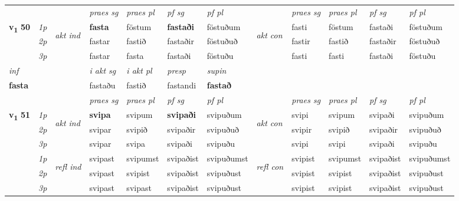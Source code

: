 \begin{longtable}[l]{X>{\footnotesize\itshape}llXXXXlXXXX}
 & &   & \textit{praes sg}  & \textit{praes pl}    & \textit{ pf sg} & \textit{pf pl} & & \textit{praes sg}  & \textit{praes pl}    & \textit{pf sg} & \textit{pf pl }  \\ \cmidrule{4-7} \cmidrule{9-12}
 \multirow{2}{*}{{{\textbf{v{\textsubscript{1}}} \Large{\textbf{50}}}}}  & 1p & \multirow{3}{*}{\begin{turn}{90}\textit{akt ind}\end{turn}} & \textbf{fasta} & föstum & \textbf{fastaði} & föstuðum & \multirow{3}{*}{\begin{turn}{90}\textit{akt con}\end{turn}} &fasti & föstum & fastaði & föstuðum\\*
 & 2p &  &  fastar  & fastið & fastaðir & föstuðuð & & fastir & fastið & fastaðir & föstuðuð \\*
 & 3p &  & fastar & fasta & fastaði & föstuðu & & fasti & fasti& fastaði & föstuðu \\*
\cmidrule{4-7} \cmidrule{9-12}

   {\textit{inf}} & &  & \textit{i akt sg} & \textit{i akt pl}   & \textit{presp} & \textit{supin}   \\*
  {\textbf{fasta}} & && fastaðu  & fastið   & fastandi &  \textbf{fastað}   \\*

\midrule

 & &   & \textit{praes sg}  & \textit{praes pl}    & \textit{ pf sg} & \textit{pf pl} & & \textit{praes sg}  & \textit{praes pl}    & \textit{pf sg} & \textit{pf pl }  \\ \cmidrule{4-7} \cmidrule{9-12}
 \multirow{2}{*}{{{\textbf{v{\textsubscript{1}}} \Large{\textbf{51}}}}}  & 1p & \multirow{3}{*}{\begin{turn}{90}\textit{akt ind}\end{turn}} & \textbf{svipa} & svipum & \textbf{svipaði} & svipuðum & \multirow{3}{*}{\begin{turn}{90}\textit{akt con}\end{turn}} &svipi & svipum & svipaði & svipuðum\\*
 & 2p &  &  svipar  & svipið & svipaðir & svipuðuð & & svipir & svipið & svipaðir & svipuðuð \\*
 & 3p &  & svipar & svipa & svipaði & svipuðu & & svipi & svipi& svipaði & svipuðu \\*
\cmidrule{4-7} \cmidrule{9-12}
 & 1p & \multirow{3}{*}{\begin{turn}{90}\textit{refl ind}\end{turn}}  & svipast & svipumst & svipaðist & svipuðumst & \multirow{3}{*}{\begin{turn}{90}\textit{refl con}\end{turn}}  &svipist & svipumst & svipaðist & svipuðumst \\*
 & 2p &  & svipast & svipist & svipaðist & svipuðust & &svipist & svipist & svipaðist & svipuðust \\*
 & 3p  & & svipast & svipast & svipaðist & svipuðust & & svipist & svipist& svipaðist & svipuðust \\*
\cmidrule{4-7} \cmidrule{9-12}


\end{longtable}

